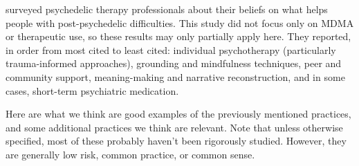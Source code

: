 \documentclass[12pt,letterpaper]{book}
\begin{document}
\textcite{argyri2025practitioner} surveyed psychedelic therapy professionals about their beliefs on what helps people with post-psychedelic difficulties. This study did not focus only on MDMA or therapeutic use, so these results may only partially apply here. They reported, in order from most cited to least cited: individual psychotherapy (particularly trauma-informed approaches), grounding and mindfulness techniques, peer and community support, meaning-making and narrative reconstruction, and in some cases, short-term psychiatric medication.

Here are what we think are good examples of the previously mentioned practices, and some additional practices we think are relevant. Note that unless otherwise specified, most of these probably haven't been rigorously studied. However, they are generally low risk, common practice, or common sense. 
\end{document}
